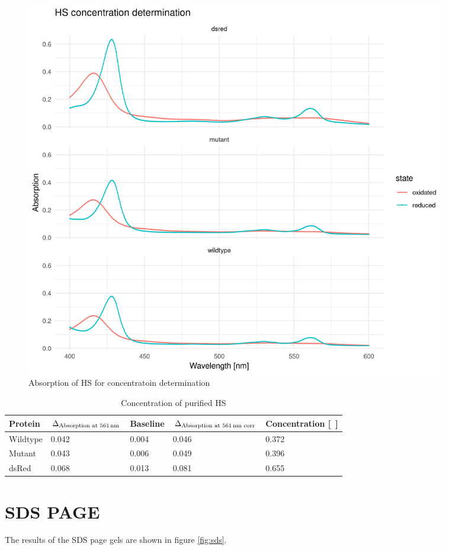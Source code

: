 \begin{figure}
	\centering
	\includegraphics[width=0.9\textwidth]{img/hs_concentration.png}
	\caption{Absorption of HS for concentratoin determination}
	\label{fig:hs_concentration}
\end{figure}

\begin{table}
	\centering
	\begin{tabu}{lllll}
		\toprule
		Protein & $\Delta_{\text{Absorption at \SI{561}{\nm}}}$ & Baseline & $\Delta_{\text{Absorption at \SI{561}{\nm} corr}}$ & Concentration [\si{\milli\Molar}] \\
		\midrule
		Wildtype & 0.042 & 0.004 & 0.046 & 0.372 \\
		Mutant & 0.043 & 0.006 & 0.049 & 0.396 \\
		dsRed & 0.068 & 0.013 & 0.081 & 0.655 \\
		\bottomrule
	\end{tabu}
	\caption{Concentration of purified HS}
	\label{tbl:hs_concentration}
\end{table}

\section{SDS PAGE}

The results of the SDS page gels are shown in figure \ref{fig:sds}.

